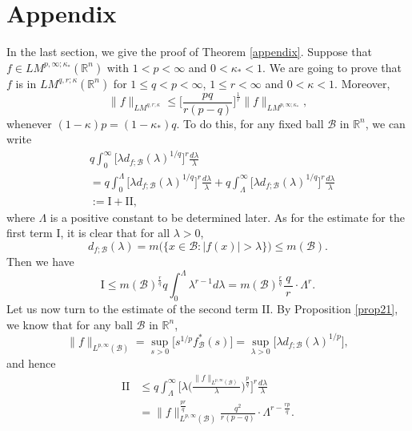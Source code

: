 \documentclass{birkjour}
\theoremstyle{definition}
\theoremstyle{remark}
\numberwithin{equation}{section}
\begin{document}
\section{Appendix}
In the last section, we give the proof of Theorem \ref{appendix}. Suppose that $f\in LM^{p,\infty;\kappa_{*}}(\mathbb R^n)$ with $1<p<\infty$ and $0<\kappa_{*}<1$. We are going to prove that $f$ is in $LM^{q,r;\kappa}(\mathbb R^n)$ for $1\leq q<p<\infty$, $1\leq r<\infty$ and $0<\kappa<1$. Moreover,
\begin{equation}\label{desiredes}
\|f\|_{LM^{q,r;\kappa}}\leq \Big[\frac{pq}{r(p-q)}\Big]^{\frac{1}{r}}\|f\|_{LM^{p,\infty;\kappa_{*}}},
\end{equation} 
whenever $(1-\kappa)p=(1-\kappa_*)q$. To do this, for any fixed ball $\mathcal{B}$ in $\mathbb R^n$, we can write
\begin{equation*}
\begin{split}
&q\int_0^{\infty}\Big[\lambda d_{f;\mathcal{B}}(\lambda)^{1/q}\Big]^r\frac{d\lambda}{\lambda}\\
&=q\int_0^{\Lambda}\Big[\lambda d_{f;\mathcal{B}}(\lambda)^{1/q}\Big]^r\frac{d\lambda}{\lambda}
+q\int_{\Lambda}^{\infty}\Big[\lambda d_{f;\mathcal{B}}(\lambda)^{1/q}\Big]^r\frac{d\lambda}{\lambda}\\
&:=\mathrm{I+II},
\end{split}
\end{equation*}
where $\Lambda$ is a positive constant to be determined later. As for the estimate for the first term $\mathrm{I}$, it is clear that for all $\lambda>0$,
\begin{equation*}
d_{f;\mathcal{B}}(\lambda)=m\big(\big\{x\in \mathcal{B}:|f(x)|>\lambda\big\}\big)\leq m(\mathcal{B}).
\end{equation*}
Then we have
\begin{equation*}
\mathrm{I}\leq m(\mathcal{B})^{\frac{r}{q}}q\int_0^{\Lambda}\lambda^{r-1}d\lambda
=m(\mathcal{B})^{\frac{r}{q}}\frac{q}{\,r\,}\cdot\Lambda^r.
\end{equation*}
Let us now turn to the estimate of the second term $\mathrm{II}$. By Proposition \ref{prop21}, we know that for any ball $\mathcal{B}$ in $\mathbb R^n$,
\begin{equation*}
\|f\|_{L^{p,\infty}(\mathcal{B})}=\sup_{s>0}\Big[s^{1/p}f^{*}_{\mathcal{B}}(s)\Big]
=\sup_{\lambda>0}\Big[\lambda d_{f;\mathcal{B}}(\lambda)^{1/p}\Big],
\end{equation*}
and hence
\begin{equation*}
\begin{split}
\mathrm{II}&\leq q\int_{\Lambda}^{\infty}
\Big[\lambda\Big(\frac{\|f\|_{L^{p,\infty}(\mathcal{B})}}{\lambda}\Big)^{\frac{p}{q}}\Big]^r\frac{d\lambda}{\lambda}\\
&=\|f\|_{L^{p,\infty}(\mathcal{B})}^{\frac{pr}{q}}\frac{q^2}{r(p-q)}\cdot\Lambda^{r-\frac{rp}{q}}.
\end{split}
\end{equation*}
\end{document}
